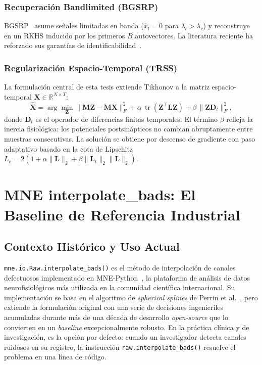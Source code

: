 \subsubsection{Recuperación Bandlimited (BGSRP)}

BGSRP~\cite{zhang_recovery_2024} asume señales limitadas en banda ($\hat{x}_l = 0$ para $\lambda_l > \lambda_c$) y reconstruye en un RKHS inducido por los primeros $B$ autovectores. La literatura reciente ha reforzado sus garantías de identificabilidad~\cite{morgenstern_theoretical_2025}.

\subsubsection{Regularización Espacio-Temporal (TRSS)}

La formulación central de esta tesis extiende Tikhonov a la matriz espacio-temporal $\mathbf{X} \in \mathbb{R}^{N \times T}$:
\begin{equation}
    \hat{\mathbf{X}} = \arg\min_{\mathbf{Z}}
    \|\mathbf{M}\mathbf{Z} - \mathbf{M}\mathbf{X}\|_F^2 + \alpha \, \operatorname{tr}(\mathbf{Z}^\top \mathbf{L} \mathbf{Z}) + \beta \, \|\mathbf{Z} \mathbf{D}_t\|_F^2,
    \label{eq:trss_obj}
\end{equation}
donde $\mathbf{D}_t$ es el operador de diferencias finitas temporales. El término $\beta$ refleja la inercia fisiológica: los potenciales postsinápticos no cambian abruptamente entre muestras consecutivas. La solución se obtiene por descenso de gradiente con paso adaptativo basado en la cota de Lipschitz $L_c = 2(1 + \alpha\|\mathbf{L}\|_2 + \beta\|\mathbf{L}_t\|_2\|\mathbf{L}\|_2)$.

\section{MNE interpolate\_bads: El Baseline de Referencia Industrial}
\label{sec:mne_confirmatorio}

\subsection{Contexto Histórico y Uso Actual}

\texttt{mne.io.Raw.interpolate\_bads()} es el método de interpolación de canales defectuosos implementado en MNE-Python~\cite{gramfort2013meg}, la plataforma de análisis de datos neurofisiológicos más utilizada en la comunidad científica internacional. Su implementación se basa en el algoritmo de \textit{spherical splines} de Perrin et al.~\cite{perrin1989}, pero extiende la formulación original con una serie de decisiones ingenieriles acumuladas durante más de una década de desarrollo \textit{open-source} que lo convierten en un \textit{baseline} excepcionalmente robusto. En la práctica clínica y de investigación, es la opción por defecto: cuando un investigador detecta canales ruidosos en su registro, la instrucción \texttt{raw.interpolate\_bads()} resuelve el problema en una línea de código.

